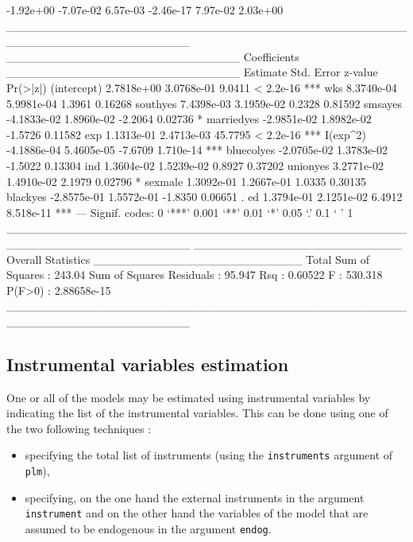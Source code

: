 \documentclass{article}
\begin{document}
\begin{Schunk}
\begin{Soutput}
-1.92e+00 -7.07e-02  6.57e-03 -2.46e-17  7.97e-02  2.03e+00 
______________________________________________________________________ 
____________________________ Coefficients ____________________________
               Estimate  Std. Error z-value  Pr(>|z|)    
(intercept)  2.7818e+00  3.0768e-01  9.0411 < 2.2e-16 ***
wks          8.3740e-04  5.9981e-04  1.3961   0.16268    
southyes     7.4398e-03  3.1959e-02  0.2328   0.81592    
smsayes     -4.1833e-02  1.8960e-02 -2.2064   0.02736 *  
marriedyes  -2.9851e-02  1.8982e-02 -1.5726   0.11582    
exp          1.1313e-01  2.4713e-03 45.7795 < 2.2e-16 ***
I(exp^2)    -4.1886e-04  5.4605e-05 -7.6709 1.710e-14 ***
bluecolyes  -2.0705e-02  1.3783e-02 -1.5022   0.13304    
ind          1.3604e-02  1.5239e-02  0.8927   0.37202    
unionyes     3.2771e-02  1.4910e-02  2.1979   0.02796 *  
sexmale      1.3092e-01  1.2667e-01  1.0335   0.30135    
blackyes    -2.8575e-01  1.5572e-01 -1.8350   0.06651 .  
ed           1.3794e-01  2.1251e-02  6.4912 8.518e-11 ***
---
Signif. codes:  0 ‘***’ 0.001 ‘**’ 0.01 ‘*’ 0.05 ‘.’ 0.1 ‘ ’ 1 
______________________________________________________________________ 
_________________________ Overall Statistics _________________________
Total Sum of Squares       : 243.04
Sum of Squares Residuals   : 95.947
Rsq                        : 0.60522
F                          : 530.318
P(F>0)                     : 2.88658e-15
______________________________________________________________________ 
\end{Soutput}
\end{Schunk}

\subsection{Instrumental variables estimation}

One or all of the models may be estimated using instrumental variables
by indicating the list of the instrumental variables. This can be done
using one of the two following techniques :

\begin{itemize}
\item specifying the total list of instruments  (using the
  \texttt{instruments} argument of \texttt{plm}),
\item specifying, on the one hand the external instruments in the argument
  \texttt{instrument} and on  the other hand the variables of the
  model that are assumed to be endogenous in the argument \texttt{endog}.
\end{itemize}
\end{document}

